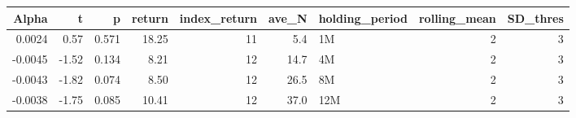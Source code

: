 \begin{table}[ht]
\centering
\begin{tabular}{rrrrrrlrr}
  \hline
Alpha & t & p & return & index\_return & ave\_N & holding\_period & rolling\_mean & SD\_thres \\ 
  \hline
0.0024 & 0.57 & 0.571 & 18.25 & 11 & 5.4 & 1M &  2 &  3 \\ 
  -0.0045 & -1.52 & 0.134 & 8.21 & 12 & 14.7 & 4M &  2 &  3 \\ 
  -0.0043 & -1.82 & 0.074 & 8.50 & 12 & 26.5 & 8M &  2 &  3 \\ 
  -0.0038 & -1.75 & 0.085 & 10.41 & 12 & 37.0 & 12M &  2 &  3 \\ 
   \hline
\end{tabular}
\end{table}

